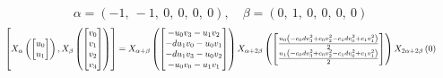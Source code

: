 \documentclass[11pt]{article}
\theoremstyle{definition}
\begin{document}
\[
\alpha = \left( -1, \  -1, \  0, \  0, \  0, \  0\right), \quad \beta = \left( 0, \  1, \  0, \  0, \  0, \  0\right)
\]
\[
\scaletoalign{\textwidth}{\left[ X_{\alpha}\left(\left[\begin{matrix}u_{0}\\u_{1}\end{matrix}\right]\right), X_{\beta}\left(\left[\begin{matrix}v_{0}\\v_{1}\\v_{2}\\v_{3}\end{matrix}\right]\right) \right] = X_{\alpha + \beta}\left(\left[\begin{matrix}- u_{0} v_{3} - u_{1} v_{2}\\- d u_{1} v_{0} - u_{0} v_{1}\\- d u_{1} v_{3} - u_{0} v_{2}\\- u_{0} v_{0} - u_{1} v_{1}\end{matrix}\right]\right) X_{\alpha + 2\beta}\left(\left[\begin{matrix}\frac{u_{0} \left(- c_{0} d v_{3}^{2} + c_{0} v_{2}^{2} - c_{1} d v_{0}^{2} + c_{1} v_{1}^{2}\right)}{2}\\\frac{u_{1} \left(- c_{0} d v_{3}^{2} + c_{0} v_{2}^{2} - c_{1} d v_{0}^{2} + c_{1} v_{1}^{2}\right)}{2}\end{matrix}\right]\right) X_{2\alpha + 2\beta}\left(0\right)}
\]
\end{document}
